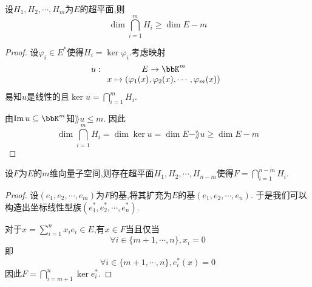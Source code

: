 \begin{prop}
    设$H_1, H_2, \cdots, H_m$为$E$的超平面,则\[ \dim \bigcap\limits_{i = 1}^m H_i \geqslant \dim E - m \]
\end{prop}

\begin{proof}
    设$\varphi_i \in E^*$使得$H_i = \ker \varphi_i$.考虑映射$$u:\begin{array}[t]{ccc}
    E \to \bbK^m \\ x \tp \left( \varphi_1(x), \varphi_2(x), \cdots, \varphi_m(x) \right) \end{array}$$
    易知$u$是线性的且$\ker u = \bigcap\limits_{i = 1}^m H_i$.

    由$\im u \subseteq \bbK^m$知$\rang u \leqslant m$.
    因此\[ \dim \bigcap\limits_{i = 1}^m H_i = \dim \ker u = \dim E - \rang u \geqslant \dim E - m \]
\end{proof}

\begin{prop}
    设$F$为$E$的$m$维向量子空间,则存在超平面$H_1, H_2, \cdots, H_{n - m}$使得$F = \bigcap\limits_{i = 1}^{n - m} H_i$.
\end{prop}

\begin{proof}
    设$(e_1, e_2, \cdots, e_m)$为$F$的基,将其扩充为$E$的基$(e_1, e_2, \cdots, e_n)$.
    于是我们可以构造出坐标线性型族$(e_1^*, e_2^*, \cdots, e_n^*)$.

    对于$x = \sum\limits_{i = 1}^n x_i e_i \in E$,有$x \in F$当且仅当
    \[ \forall i \in \{ m + 1, \cdots, n \}, x_i = 0 \]即\[ \forall i \in \{ m + 1, \cdots, n \}, e_i^*(x) = 0 \]
    因此$F = \bigcap\limits_{i = m + 1}^n \ker e_i^*$.
\end{proof}